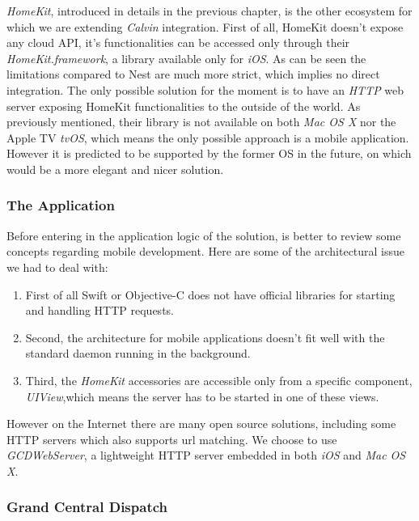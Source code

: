 \textit{HomeKit}, introduced in details in the previous chapter, is the other ecosystem
for which we are extending \textit{Calvin} integration. First of all, HomeKit doesn't
expose any cloud API, it's functionalities can be accessed only through their \textit{HomeKit.framework},
a library available only for \textit{iOS}. As can be seen the limitations compared to Nest
are much more strict, which implies no direct integration. The only possible solution for the
moment is to have an \textit{HTTP} web server exposing HomeKit functionalities to the outside of
the world. As previously mentioned, their library is not available on both \textit{Mac OS X} nor
the Apple TV \textit{tvOS}, which means the only possible approach is a mobile application.
However it is predicted to be supported by the former OS in the future, on which would be a more
elegant and nicer solution.\\

\subsubsection{The Application}

Before entering in the application logic of the solution, is better to review
some concepts regarding mobile development. Here are some of the architectural
issue we had to deal with:


\begin{enumerate}
    \item First of all Swift or Objective-C does not have official libraries for
    starting and handling HTTP requests.
    \item Second, the architecture for mobile applications
    doesn't fit well with the standard daemon running in the background.
    \item Third, the \textit{HomeKit} accessories are accessible only from a
    specific component, \textit{UIView},which means the server has to be started
    in one of these views.
\end{enumerate}

However on the Internet there are many open source solutions, including some HTTP
servers which also supports url matching. We choose to use \textit{GCDWebServer}\cite{gcdwebserver}, a lightweight
HTTP server embedded in both \textit{iOS} and \textit{Mac OS X}.

\subsubsection{Grand Central Dispatch}

